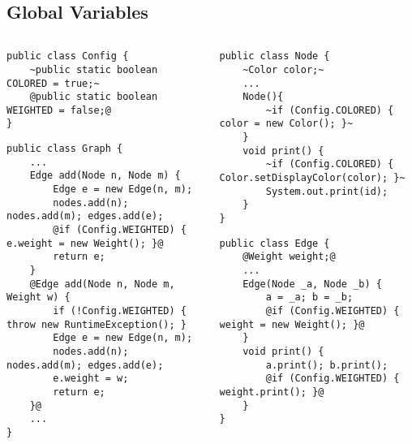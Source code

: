 \subsection{Global Variables}
\begin{frame}[fragile]{\myframetitle}
		\begin{columns}
\begin{tiny}
\begin{lstlisting}
public class Config {
	~public static boolean COLORED = true;~
	@public static boolean WEIGHTED = false;@
}
\end{lstlisting}
\begin{lstlisting}
public class Graph {
	...
	Edge add(Node n, Node m) {
		Edge e = new Edge(n, m);
		nodes.add(n); nodes.add(m); edges.add(e);
		@if (Config.WEIGHTED) { e.weight = new Weight(); }@
		return e;
	}
	@Edge add(Node n, Node m, Weight w) {
		if (!Config.WEIGHTED) { throw new RuntimeException(); }
		Edge e = new Edge(n, m);
		nodes.add(n); nodes.add(m); edges.add(e);
		e.weight = w;
		return e;
	}@
	...
}
\end{lstlisting}
\end{tiny}	
\begin{tiny}
\begin{lstlisting}
public class Node {
	~Color color;~
	...
	Node(){
		~if (Config.COLORED) { color = new Color(); }~
	}
	void print() {
		~if (Config.COLORED) { Color.setDisplayColor(color); }~
		System.out.print(id);
	}
}
\end{lstlisting}
\begin{lstlisting}
public class Edge {
	@Weight weight;@
	...
	Edge(Node _a, Node _b) {
		a = _a; b = _b;
		@if (Config.WEIGHTED) { weight = new Weight(); }@
	}
	void print() {
		a.print(); b.print();
		@if (Config.WEIGHTED) { weight.print(); }@
	}
}
\end{lstlisting}
\end{tiny}	
		\end{columns}
\end{frame}

